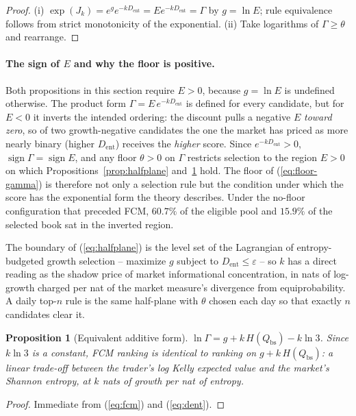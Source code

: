 \documentclass[11pt]{article}
\newtheorem{proposition}{Proposition}
\newcommand{\dent}{D_{\mathrm{ent}}}
\newcommand{\Qbs}{Q_{\mathrm{bs}}}
\begin{document}
\begin{proof}
(i) $\exp(J_k) = e^g e^{-k\dent} = E e^{-k\dent} = \Gamma$ by
$g = \ln E$; rule equivalence follows from strict monotonicity of the
exponential. (ii) Take logarithms of $\Gamma \geq \theta$ and rearrange.
\end{proof}

\paragraph{The sign of $E$ and why the floor is positive.} Both propositions in
this section require $E > 0$, because $g = \ln E$ is undefined otherwise. The
product form $\Gamma = E\,e^{-k\dent}$ is defined for every candidate, but for
$E < 0$ it inverts the intended ordering: the discount pulls a negative $E$
\emph{toward zero}, so of two growth-negative candidates the one the market has
priced as more nearly binary (higher $\dent$) receives the \emph{higher} score.
Since $e^{-k\dent} > 0$, $\operatorname{sign}\Gamma = \operatorname{sign} E$,
and any floor $\theta > 0$ on $\Gamma$ restricts selection to the region
$E > 0$ on which Propositions~\ref{prop:halfplane} and~\ref{prop:additive}
hold. The floor of (\ref{eq:floor-gamma}) is therefore not only a selection
rule but the condition under which the score has the exponential form the
theory describes. Under the no-floor configuration that preceded FCM,
$60.7\%$ of the eligible pool and $15.9\%$ of the selected book sat in the
inverted region.

The boundary of (\ref{eq:halfplane}) is the level set of the Lagrangian of
entropy-budgeted growth selection -- maximize $g$ subject to
$\dent \leq \varepsilon$ -- so $k$ has a direct reading as the shadow price of
market informational concentration, in nats of log-growth charged per nat of
the market measure's divergence from equiprobability. A daily top-$n$ rule is
the same half-plane with $\theta$ chosen each day so that exactly $n$
candidates clear it.

\begin{proposition}[Equivalent additive form]
\label{prop:additive}
$\ln\Gamma = g + k\,H(\Qbs) - k \ln 3$. Since $k\ln 3$ is a constant, FCM
ranking is identical to ranking on $g + k\,H(\Qbs)$: a linear trade-off
between the trader's log Kelly expected value and the market's Shannon
entropy, at $k$ nats of growth per nat of entropy.
\end{proposition}

\begin{proof}
Immediate from (\ref{eq:fcm}) and (\ref{eq:dent}).
\end{proof}
\end{document}
